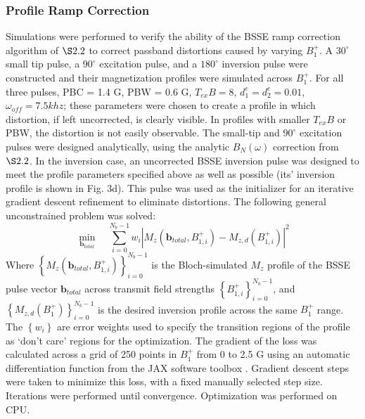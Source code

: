 \documentclass{article}
\renewcommand{\textcolor}[1]{}
\begin{document}
\subsubsection*{Profile Ramp Correction}
Simulations were performed to verify the ability of the BSSE ramp correction algorithm of $\S 2.2$ to correct passband distortions caused by varying $B_1^+$.
A $30^\circ$ small tip pulse, a $90^\circ$ excitation pulse, and a $180^\circ$ inversion pulse were constructed and their magnetization profiles were simulated across $B_1^+$.
For all three pulses, PBC = 1.4 G, PBW = 0.6 G, $T_{ex}B = 8$, $d_1^e=d_2^e=0.01$, $\omega_{off}=7.5khz$; 
these parameters were chosen to create a profile in which distortion, if left uncorrected, is clearly visible.
In profiles with smaller $T_{ex}B$ or PBW, the distortion is not easily observable. 
The small-tip and $90^\circ$ excitation pulses were designed analytically, 
using the analytic $B_N(\omega)$ correction from $\S 2.2$.
In the inversion case, 
an uncorrected BSSE inversion pulse was designed to meet the profile parameters specified above as well as possible (its' inversion profile is shown in Fig. 3d).
This pulse was used as the initializer for an iterative gradient descent refinement to eliminate distortions. 
The following general unconstrained problem was solved:
\begin{equation}
\min_{\bm{b}_{total}} \quad \sum_{i = 0}^{N_b - 1} w_i \left\vert M_z\left(\bm{b}_{total}, B_{1,i}^+\right) - M_{z,d}\left(B_{1,i}^+\right) \right\vert^2
\end{equation}
Where $\left\{M_z(\bm{b}_{total}, B_{1,i}^+)\right\}_{i = 0}^{N_b - 1}$ 
is the Bloch-simulated $M_z$ profile of the BSSE pulse vector $\bm{b}_{total}$ 
across transmit field strengths $\left\{B_{1,i}^+\right\}_{i=0}^{N_b-1}$, 
and $\left\{M_{z,d}(B_1^+)\right\}_{i=0}^{N_b-1}$ is the desired inversion profile across the same $B_1^+$ range. 
The $\left\{w_i\right\}$ are error weights used to specify the transition regions of the profile as `don't care' regions for the optimization.
The gradient of the loss was calculated across a grid of 250 points in $B_1^+$ from 0 to 2.5 G using an automatic differentiation function from the JAX software toolbox \cite{Bradbury2018JAX:Programs}. Gradient descent steps were taken to minimize this loss, with a fixed manually selected step size. 
Iterations were performed until convergence.
Optimization was performed on CPU.
\end{document}
